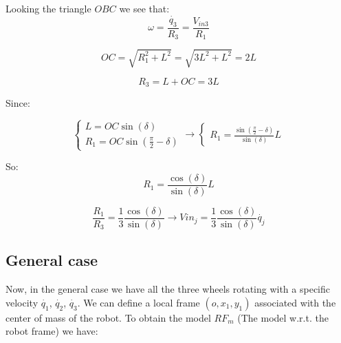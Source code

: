 Looking the triangle $OBC$ we see that:
\begin{equation*}
    \omega = \frac{\dot{q_{3}}}{R_{3}} = \frac{V_{in3}}{R_{1}}         
\end{equation*}

\begin{equation*}
    OC = \sqrt{R_{1}^{2}+L^{2}}= \sqrt{3L^{2}+L^{2}} = 2L
\end{equation*}

\begin{equation*}
    R_{3} = L + OC =3L
\end{equation*}

Since:


\begin{equation*}
    \left\{
        \begin{array}{ll}
            L= OC\sin(\delta) \\
            R_{1}= OC\sin(\frac{\pi}{2} - \delta)
        \end{array}
    \right. \to \left\{
    \begin{array}{ll}
            R_{1}= \frac{\sin(\frac{\pi}{2} - \delta)}{\sin(\delta)}L
            \end{array}
            \right.
\end{equation*}




So:
\begin{equation*}
    R_{1} = \frac{\cos(\delta)}{\sin(\delta)}L
\end{equation*}

\begin{equation*}
    \frac{R_{1}}{R_{3}} = \frac{1}{3}\frac{\cos(\delta)}{\sin(\delta)} \to Vin_{j}= \frac{1}{3}\frac{\cos(\delta)}{\sin(\delta)} \dot{q_{j}}
\end{equation*}


\subsection{General case}
Now, in the general case we have all the three wheels rotating with a specific velocity $\dot{q_{1}}$, $\dot{q_{2}}$, $\dot{q_{3}}$. We can define a local frame $(o,x_{1},y_{1})$ associated with the center of mass of the robot. To obtain the model $RF_{m}$ (The model w.r.t. the robot frame) we have:


